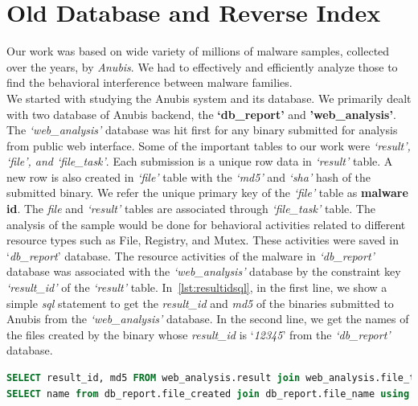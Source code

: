 \section{Old Database and Reverse Index}
\label{sec:Old Database and Reverse Index}
Our work was based on wide variety of millions of malware samples, collected over the years, by \emph{Anubis}.
We had to effectively and efficiently analyze those to find the behavioral interference between malware families.\\
We started with studying the Anubis system and its database.
We primarily dealt with two database of Anubis backend, the \textbf{`db\_report'} and \textbf{'web\_analysis'}.
The \emph{`web\_analysis'} database was hit first for any binary submitted for analysis from public web interface.
Some of the important tables to our work were \emph{`result', `file', and `file\_task'}.
Each submission is a unique row data in \emph{`result'} table.
A new row is also created in \emph{`file'} table with the \emph{`md5'} and \emph{`sha'} hash of the submitted binary.
We refer the unique primary key of the \emph{`file'} table as \textbf{malware id}.
The \emph{file} and \emph{`result'} tables are associated through \emph{`file\_task'} table.
The analysis of the sample would be done for behavioral activities related to different resource types such as File, Registry, and Mutex.
These activities were saved in `\emph{db\_report}' database.
The resource activities of the malware in \emph{`db\_report'} database was associated with the \emph{`web\_analysis'} database by the constraint key \textit{`result\_id'} of the \emph{`result'} table.
In~\autoref{lst:resultidsql}, in the first line, we show a simple \emph{sql} statement to get the \emph{result\_id} and \emph{md5} of the binaries submitted to Anubis from the \emph{`web\_analysis'} database.
In the second line, we get the names of the files created by the binary whose \emph{result\_id} is `\emph{12345}' from the \emph{`db\_report'} database.\\
\begin{lstlisting}[language=sql,caption={sql showing database structure to get file created activities of a malware sample},label={lst:resultidsql}]
SELECT result_id, md5 FROM web_analysis.result join web_analysis.file_task using (task_id) join web_analysis.file using (file_id) WHERE task_id = result_id;
SELECT name from db_report.file_created join db_report.file_name using (file_name_id) where result_id = '12345';
\end{lstlisting}

